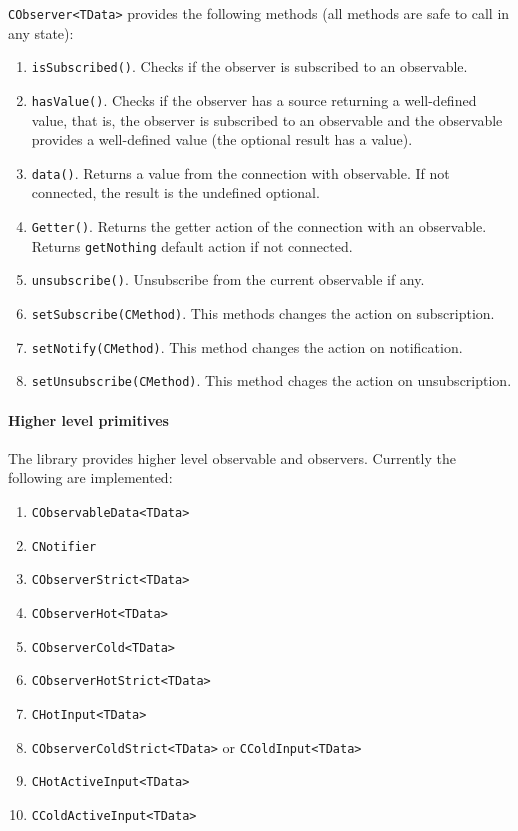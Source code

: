 \documentclass{article}
\begin{document}
\verb"CObserver<TData>" provides the following methods (all methods are safe to call in any state):
\begin{enumerate}
\item \verb"isSubscribed()". Checks if the observer is subscribed to an observable.
\item \verb"hasValue()". Checks if the observer has a source returning a well-defined value, that is, the observer is subscribed to an observable and the observable provides a well-defined value (the optional result has a value).
\item \verb"data()". Returns a value from the connection with observable. If not connected, the result is the undefined optional.
\item \verb"Getter()". Returns the getter action of the connection with an observable. Returns \verb"getNothing" default action if not connected.
\item \verb"unsubscribe()". Unsubscribe from the current observable if any.
\item \verb"setSubscribe(CMethod)". This methods changes the action on subscription.
\item \verb"setNotify(CMethod)". This method changes the action on notification.
\item \verb"setUnsubscribe(CMethod)". This method chages the action on unsubscription.
\end{enumerate}

\paragraph{Higher level primitives} The library provides higher level observable and observers. Currently the following are implemented:
\begin{enumerate}
\item \verb"CObservableData<TData>"
\item \verb"CNotifier"
\item \verb"CObserverStrict<TData>"
\item \verb"CObserverHot<TData>"
\item \verb"CObserverCold<TData>"
\item \verb"CObserverHotStrict<TData>"
\item \verb"CHotInput<TData>"
\item \verb"CObserverColdStrict<TData>" or  \verb"CColdInput<TData>"
\item \verb"CHotActiveInput<TData>"
\item \verb"CColdActiveInput<TData>"
\end{enumerate}
\end{document}
